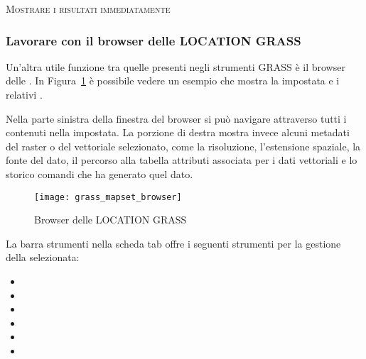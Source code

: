 \begin{Tip}\caption{\textsc{Mostrare i risultati immediatamente}}
\end{Tip} 

\subsubsection{Lavorare con il browser delle LOCATION GRASS} 

Un'altra utile funzione tra quelle presenti negli strumenti GRASS è il browser
delle . In Figura~\ref{fig:grass_mapset_browser} è
possibile vedere un esempio che mostra la  impostata 
e i relativi .

Nella parte sinistra della finestra del browser si può navigare attraverso
tutti i  contenuti nella  impostata. La
porzione di destra mostra invece alcuni metadati del raster o del vettoriale
selezionato, come la risoluzione, l'estensione spaziale, la fonte del dato, il
percorso alla tabella attributi associata per i dati vettoriali e lo storico
comandi che ha generato quel dato.

\begin{figure}[h]
 \begin{center}
 \caption{Browser delle LOCATION GRASS \nixcaption}\label{fig:grass_mapset_browser}
 \texttt{[image: grass\_mapset\_browser]}
 \end{center}
\end{figure}

La barra strumenti nella scheda  tab offre i seguenti
strumenti per la gestione della  selezionata:

\begin{itemize}
\item {}
\item {}
\item {}
\item {}
\item {}
\item {}
\end{itemize}

